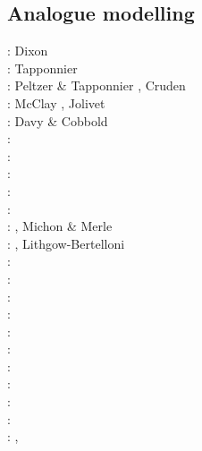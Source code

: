 \subsection{Analogue modelling}

{\scriptsize
\nineteenseventyfive: Dixon \cite{dixo75}\\
\nineteeneightytwo: Tapponnier \etal \cite{tapl82}\\
\nineteeneightyeight: Peltzer \& Tapponnier \cite{peta88}, Cruden \cite{crud88}\\
\nineteenninety: McClay \cite{mccl90}, Jolivet \etal \cite{jodc90}\\
\nineteenninetyone: Davy \& Cobbold \cite{daco91}\\
\nineteenninetytwo: \cite{salt92}\\
\nineteenninetythree: \cite{nabr93}\cite{shem93}\\
\nineteenninetyseven: \cite{vank97}\\
\nineteenninetyeight: \cite{bubr98}\\
\nineteenninetynine: \cite{dava99}\cite{befo99}\cite{fagd99}\cite{nagg99}\\
\twothousand: \cite{sche00}\cite{sobm00}\cite{chlb00}, Michon \& Merle \cite{mime00}\\
\twothousandone: \cite{haki01}\cite{chys01}, Lithgow-Bertelloni \cite{lirc01}\\
\twothousandtwo: \cite{dagl02}\\
\twothousandthree: \cite{smbs03}\cite{muso03}\cite{nagv03}\\
\twothousandfour: \cite{sche04}\cite{sche04b}\\
\twothousandfive: \cite{jujb05}\cite{sche05}\cite{sobb05}\\
\twothousandsix: \cite{scbb06}\cite{tibs06}\cite{crnp06}\cite{lemm06}\cite{pabs06}\cite{malm06}\\
\twothousandseven: \cite{socb07}\\
\twothousandeight: \cite{clbz08}\cite{fufh08}\cite{esfm08}\\
\twothousandnine: \cite{pina09}\cite{bonn09}\\
\twothousandeleven: \cite{dalt11}\cite{gopc11}\cite{grhd11}\\
\twothousandtwelve: \cite{grmd12}\cite{iadc12}\\
\twothousandthirteen: \cite{luws13}\cite{vadv13}\cite{guhf13}\cite{mibg13}\cite{mesc13}\cite{dusc13}\cite{kern13}, 
}
